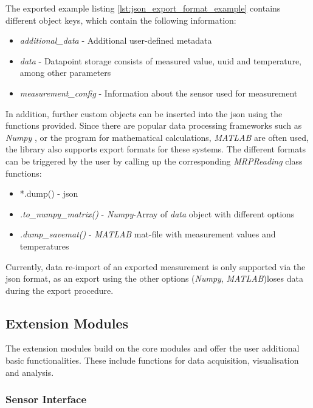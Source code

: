 The exported example listing \ref{lst:json_export_format_example}
contains different object keys, which contain the following information:

\begin{itemize}
\tightlist
\item
  \emph{additional\_data} - Additional user-defined metadata
\item
  \emph{data} - Datapoint storage consists of measured value, \gls{uuid}
  and temperature, among other parameters
\item
  \emph{measurement\_config} - Information about the sensor used for
  measurement
\end{itemize}

In addition, further custom objects can be inserted into the \gls{json}
using the functions provided. Since there are popular data processing
frameworks such as \emph{Numpy} , or the program for
mathematical calculations, \emph{MATLAB} are often used, the library
also supports export formats for these systems. The different formats
can be triggered by the user by calling up the corresponding
\emph{MRPReading} class functions:

\begin{itemize}
\tightlist
\item
  *.dump() - \gls{json}
\item
  \emph{.to\_numpy\_matrix()} - \emph{Numpy}-Array of \emph{data} object
  with different options
\item
  \emph{.dump\_savemat()} - \emph{MATLAB} mat-file with measurement
  values and temperatures
\end{itemize}

Currently, data re-import of an exported measurement is only supported
via the \gls{json} format, as an export using the other options
(\emph{Numpy}, \emph{MATLAB})loses data during the export procedure.

\hypertarget{extension-modules}{%
\subsection{Extension Modules}\label{extension-modules}}

The extension modules build on the core modules and offer the user
additional basic functionalities. These include functions for data
acquisition, visualisation and analysis.

\hypertarget{sensor-interface}{%
\subsubsection{Sensor Interface}\label{sensor-interface}}

